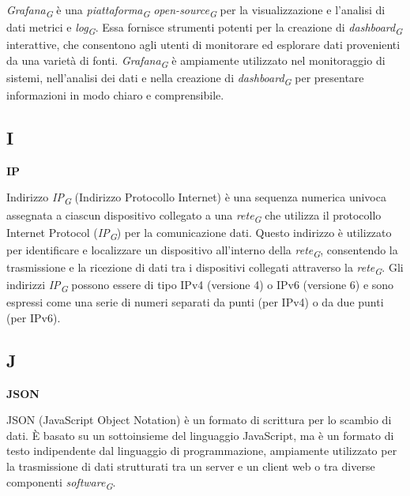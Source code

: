 \textit{Grafana}\textsubscript{\textit{G}} è una \textit{piattaforma}\textsubscript{\textit{G}} \textit{open-source}\textsubscript{\textit{G}} per la visualizzazione e l'analisi di dati metrici e \textit{log}\textsubscript{\textit{G}}. Essa fornisce strumenti potenti per la creazione di \textit{dashboard}\textsubscript{\textit{G}} interattive, che consentono agli utenti di monitorare ed esplorare dati provenienti da una varietà di fonti. \textit{Grafana}\textsubscript{\textit{G}} è ampiamente utilizzato nel monitoraggio di sistemi, nell'analisi dei dati e nella creazione di \textit{dashboard}\textsubscript{\textit{G}} per presentare informazioni in modo chiaro e comprensibile.

\subsection{I}

\vspace{0.4cm}

\textbf{IP}

\vspace{0.1cm}

Indirizzo \textit{IP}\textsubscript{\textit{G}} (Indirizzo Protocollo Internet) è una sequenza numerica univoca assegnata a ciascun dispositivo collegato a una \textit{rete}\textsubscript{\textit{G}} che utilizza il protocollo Internet Protocol (\textit{IP}\textsubscript{\textit{G}}) per la comunicazione dati. Questo indirizzo è utilizzato per identificare e localizzare un dispositivo all'interno della \textit{rete}\textsubscript{\textit{G}}, consentendo la trasmissione e la ricezione di dati tra i dispositivi collegati attraverso la \textit{rete}\textsubscript{\textit{G}}. Gli indirizzi \textit{IP}\textsubscript{\textit{G}} possono essere di tipo IPv4 (versione 4) o IPv6 (versione 6) e sono espressi come una serie di numeri separati da punti (per IPv4) o da due punti (per IPv6).

\subsection{J}

\vspace{0.4cm}

\textbf{JSON}

\vspace{0.1cm}

JSON (JavaScript Object Notation) è un formato di scrittura per lo scambio di dati. È basato su un sottoinsieme del linguaggio JavaScript, ma è un formato di testo indipendente dal linguaggio di programmazione, ampiamente utilizzato per la trasmissione di dati strutturati tra un server e un client web o tra diverse componenti \textit{software}\textsubscript{\textit{G}}.

